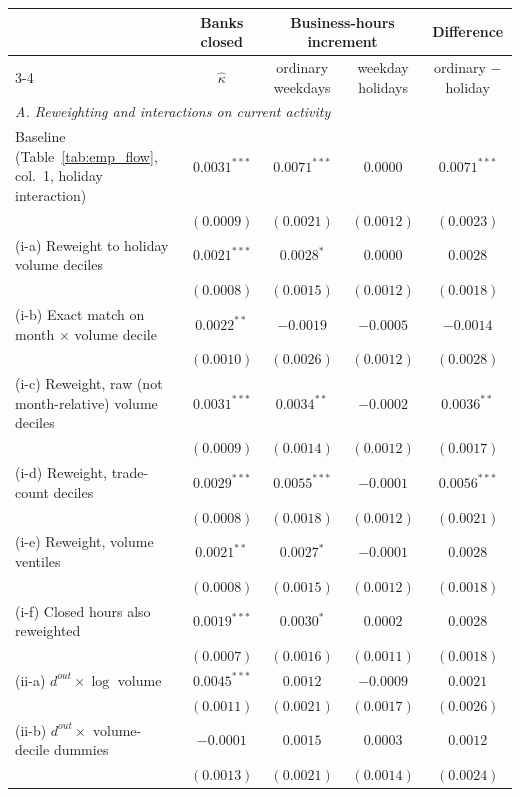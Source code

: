 \begin{tabular}{lcccc}
\toprule
 & Banks closed & \multicolumn{2}{c}{Business-hours increment} & Difference \\
\cmidrule(lr){3-4}
 & $\hat\kappa$ & ordinary weekdays & weekday holidays & ordinary $-$ holiday \\
\midrule
\multicolumn{5}{l}{\emph{A. Reweighting and interactions on current activity}} \\
Baseline (Table~\ref{tab:emp_flow}, col.~1, holiday interaction) & $0.0031^{***}$ & $0.0071^{***}$ & $0.0000$ & $0.0071^{***}$ \\
 & $(0.0009)$ & $(0.0021)$ & $(0.0012)$ & $(0.0023)$ \\
(i-a) Reweight to holiday volume deciles & $0.0021^{***}$ & $0.0028^{*}$ & $0.0000$ & $0.0028$ \\
 & $(0.0008)$ & $(0.0015)$ & $(0.0012)$ & $(0.0018)$ \\
(i-b) Exact match on month $\times$ volume decile & $0.0022^{**}$ & $-0.0019$ & $-0.0005$ & $-0.0014$ \\
 & $(0.0010)$ & $(0.0026)$ & $(0.0012)$ & $(0.0028)$ \\
(i-c) Reweight, raw (not month-relative) volume deciles & $0.0031^{***}$ & $0.0034^{**}$ & $-0.0002$ & $0.0036^{**}$ \\
 & $(0.0009)$ & $(0.0014)$ & $(0.0012)$ & $(0.0017)$ \\
(i-d) Reweight, trade-count deciles & $0.0029^{***}$ & $0.0055^{***}$ & $-0.0001$ & $0.0056^{***}$ \\
 & $(0.0008)$ & $(0.0018)$ & $(0.0012)$ & $(0.0021)$ \\
(i-e) Reweight, volume ventiles & $0.0021^{**}$ & $0.0027^{*}$ & $-0.0001$ & $0.0028$ \\
 & $(0.0008)$ & $(0.0015)$ & $(0.0012)$ & $(0.0018)$ \\
(i-f) Closed hours also reweighted & $0.0019^{***}$ & $0.0030^{*}$ & $0.0002$ & $0.0028$ \\
 & $(0.0007)$ & $(0.0016)$ & $(0.0011)$ & $(0.0018)$ \\
(ii-a) $d^{out}\times\log$ volume & $0.0045^{***}$ & $0.0012$ & $-0.0009$ & $0.0021$ \\
 & $(0.0011)$ & $(0.0021)$ & $(0.0017)$ & $(0.0026)$ \\
(ii-b) $d^{out}\times$ volume-decile dummies & $-0.0001$ & $0.0015$ & $0.0003$ & $0.0012$ \\
 & $(0.0013)$ & $(0.0021)$ & $(0.0014)$ & $(0.0024)$ \\

\end{tabular}
